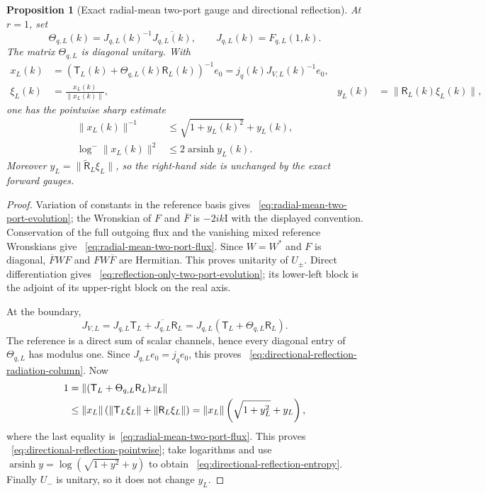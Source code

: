 \documentclass[11pt]{article}
\newcommand{\Id}{\mathrm I}
\newtheorem{proposition}[theorem]{Proposition}
\theoremstyle{definition}
\theoremstyle{remark}
\begin{document}
\begin{proposition}[Exact radial-mean two-port gauge and directional reflection]
At $r=1$, set
\begin{equation}
 \Theta_{q,L}(k)=J_{q,L}(k)^{-1}\overline{J_{q,L}(k)},
 \qquad J_{q,L}(k)=F_{q,L}(1,k).
 \label{eq:radial-mean-boundary-phase}
\end{equation}
The matrix $\Theta_{q,L}$ is diagonal unitary.  With
\begin{align}
 x_L(k)&=
 \left(\mathsf T_L(k)+\Theta_{q,L}(k)\mathsf R_L(k)\right)^{-1}e_0
 =j_q(k)J_{V,L}(k)^{-1}e_0,
 \label{eq:directional-reflection-radiation-column}\\
 \xi_L(k)&=\frac{x_L(k)}{\|x_L(k)\|},
 &y_L(k)&=\|\mathsf R_L(k)\xi_L(k)\|,
 \label{eq:directional-reflection-state}
\end{align}
one has the pointwise sharp estimate
\begin{align}
 \|x_L(k)\|^{-1}
 &\leq\sqrt{1+y_L(k)^2}+y_L(k),
 \label{eq:directional-reflection-pointwise}\\
 \log^-\|x_L(k)\|^2
 &\leq2\operatorname{arsinh}y_L(k).
 \label{eq:directional-reflection-entropy}
\end{align}
Moreover $y_L=\|\widetilde{\mathsf R}_L\xi_L\|$, so the right-hand side is
unchanged by the exact forward gauges.
\end{proposition}

\begin{proof}
Variation of constants in the reference basis gives
~\eqref{eq:radial-mean-two-port-evolution}; the Wronskian of $F$ and
$\overline F$ is $-2ik\Id$ with the displayed convention.  Conservation of
the full outgoing flux and the vanishing mixed reference Wronskians give
~\eqref{eq:radial-mean-two-port-flux}.  Since $W=W^*$ and $F$ is diagonal,
$\overline FWF$ and $FW\overline F$ are Hermitian.  This proves unitarity of
$U_\pm$.  Direct differentiation gives
~\eqref{eq:reflection-only-two-port-evolution}; its lower-left block is the
adjoint of its upper-right block on the real axis.

At the boundary,
\begin{equation}
 J_{V,L}=J_{q,L}\mathsf T_L+\overline{J_{q,L}}\mathsf R_L
 =J_{q,L}(\mathsf T_L+\Theta_{q,L}\mathsf R_L).
\end{equation}
The reference is a direct sum of scalar channels, hence every diagonal entry
of $\Theta_{q,L}$ has modulus one.  Since $J_{q,L}e_0=j_qe_0$, this proves
~\eqref{eq:directional-reflection-radiation-column}.  Now
\begin{align}
 1
 &=\|(\mathsf T_L+\Theta_{q,L}\mathsf R_L)x_L\|\notag\\
 &\leq\|x_L\|\left(
       \|\mathsf T_L\xi_L\|+\|\mathsf R_L\xi_L\|\right)
 =\|x_L\|\left(\sqrt{1+y_L^2}+y_L\right),
\end{align}
where the last equality is~\eqref{eq:radial-mean-two-port-flux}.  This proves
~\eqref{eq:directional-reflection-pointwise}; take logarithms and use
$\operatorname{arsinh}y=\log(\sqrt{1+y^2}+y)$ to obtain
~\eqref{eq:directional-reflection-entropy}.  Finally $U_-$ is unitary, so it
does not change $y_L$.
\end{proof}
\end{document}
